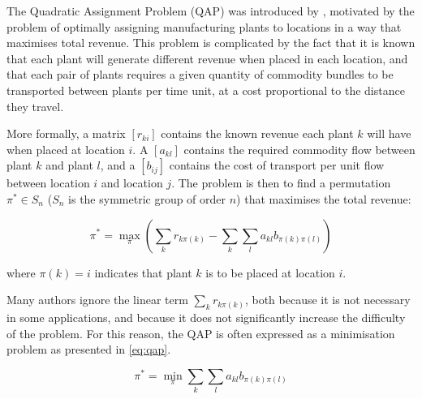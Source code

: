 
%

The Quadratic Assignment Problem (QAP) was introduced by \citet{Koopmans:1957gf}, motivated by the problem of optimally assigning manufacturing plants to locations in a way that maximises total revenue.
This problem is complicated by the fact that it is known that each plant will generate different revenue when placed in each location, and that each pair of plants requires a given quantity of commodity bundles to be transported between plants per time unit, at a cost proportional to the distance they travel.

More formally, a matrix \([r_{ki}]\) contains the known revenue each plant \(k\) will have when placed at location \(i\).
A  \([a_{kl}]\) contains the required commodity flow between plant \(k\) and plant \(l\), and a  \([b_{ij}]\) contains the cost of transport per unit flow between location \(i\) and location \(j\). %
The problem is then to find a permutation \(\pi^{*} \in S_n\) (\(S_n\) is the symmetric group of order \(n\)) that maximises the total revenue:

\[ \pi^{*} = \max_{\pi} \left(\sum_{k}{r_{k\pi(k)}} - \sum_{k}\sum_{l}{a_{kl}b_{\pi(k)\pi(l)}}\right) \]

where  \(\pi(k) = i\) indicates that plant \(k\) is to be placed at location \(i\).

Many authors ignore the linear term \(\sum_{k}{r_{k\pi(k)}}\), both because it is not necessary in some applications, and because it does not significantly increase the difficulty of the problem. For this reason, the QAP is often expressed as a minimisation problem as presented in \eqref{eq:qap}.

\begin{equation}
    \label{eq:qap}
    \pi^{*} = \min_{\pi} \sum_{k}\sum_{l}{a_{kl}b_{\pi(k)\pi(l)}}
\end{equation}

